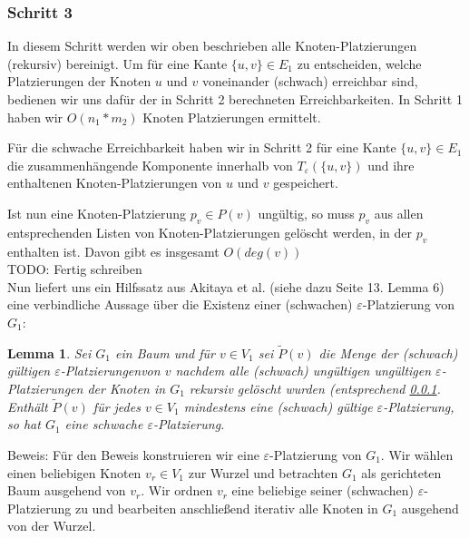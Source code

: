 \documentclass[a4paper, 12pt, twoside]{article}
\theoremstyle{Format1} %
\newtheorem{Lem}[Def]{Lemma}                %
\begin{document}
\subsubsection{Schritt 3} \label{Schritt 3}
In diesem Schritt werden wir oben beschrieben alle Knoten-Platzierungen (rekursiv) bereinigt.
Um für eine Kante $\{u,v\} \in E_1$ zu entscheiden, welche Platzierungen der Knoten $u$ und $v$ voneinander (schwach) erreichbar sind, bedienen wir uns dafür der in
Schritt 2 berechneten Erreichbarkeiten. In Schritt 1 haben wir $O(n_1*m_2)$ Knoten Platzierungen ermittelt.

Für die schwache Erreichbarkeit haben wir in Schritt 2 für eine Kante $\{u,v\} \in E_1$ die zusammenhängende Komponente innerhalb von $T_{\varepsilon}(\{u,v\})$
und ihre enthaltenen Knoten-Platzierungen von $u$ und $v$ gespeichert.

Ist nun eine Knoten-Platzierung $p_v \in P(v)$ ungültig, so muss $p_v$ aus allen entsprechenden Listen von Knoten-Platzierungen gelöscht werden, in
der $p_v$ enthalten ist. Davon gibt es insgesamt $O(deg(v))$
\\
TODO: Fertig schreiben
\\

Nun liefert uns ein Hilfssatz aus Akitaya et al. (siehe dazu Seite 13. Lemma 6) eine verbindliche Aussage über die Existenz
einer (schwachen) $\varepsilon$-Platzierung von $G_1$:

\begin{Lem} \label {Lemma 1}
	Sei $G_1$ ein Baum und für $v \in V_1$ sei $\tilde{P}(v)$ die Menge der (schwach) gültigen $\varepsilon$-Platzierungenvon $v$ nachdem
	alle (schwach) ungültigen ungültigen $\varepsilon$-Platzierungen der Knoten in $G_1$ rekursiv gelöscht wurden (entsprechend \ref{Schritt 3}.
	Enthält $\tilde{P}(v)$ für jedes $v \in V_1$ mindestens eine (schwach) gültige $\varepsilon$-Platzierung, so hat $G_1$ eine schwache $\varepsilon$-Platzierung.
\end{Lem}

Beweis:
Für den Beweis konstruieren wir eine $\varepsilon$-Platzierung von $G_1$.
Wir wählen einen beliebigen Knoten $v_r \in V_1$ zur Wurzel und betrachten $G_1$ als gerichteten Baum ausgehend von $v_r$.
Wir ordnen $v_r$ eine beliebige seiner (schwachen) $\varepsilon$-Platzierung zu und bearbeiten anschließend iterativ alle
Knoten in $G_1$ ausgehend von der Wurzel.
\end{document}
